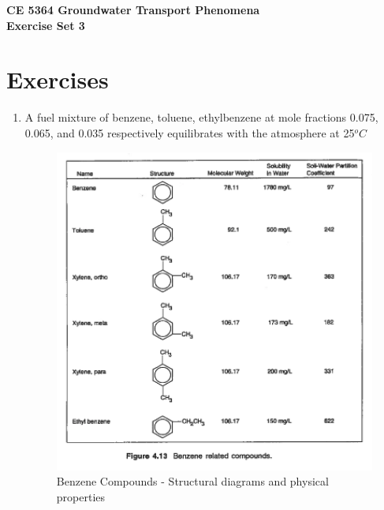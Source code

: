 \documentclass[12pt]{article}
\begin{document}
\begin{center}
{\textbf{{ CE 5364 Groundwater Transport Phenomena } \\ {Exercise Set 3}}}
\end{center}

\section*{\small{Exercises}}
\begin{enumerate} %


\item 

A fuel mixture of benzene, toluene, ethylbenzene at mole fractions 0.075, 0.065, and 0.035 respectively equilibrates with the atmosphere at 25$^oC$

\begin{figure}[h!] %
   \centering
   \includegraphics[width=5in]{Fig4-13.png} 
   \caption{Benzene Compounds - Structural diagrams and physical properties}
   \label{fig:plumemap}
\end{figure}


\end{enumerate}
\end{document}
